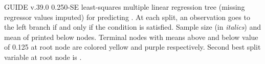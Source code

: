 \documentclass[12pt]{article}
\begin{document}
 \begin{center}
 \end{center}
GUIDE v.39.0 0.250-SE
least-squares multiple linear regression tree
 (missing regressor values imputed)
for predicting \texttt{}.
At each split, an observation goes to the left branch 
 if and only if the condition is satisfied.
Sample size (in \emph{italics}) and mean of \texttt{} printed below nodes.
 Terminal nodes with means above and below value of  0.125  at root node are colored yellow and purple respectively.
 Second best split variable at root node is \texttt{}.
 
\end{document}
